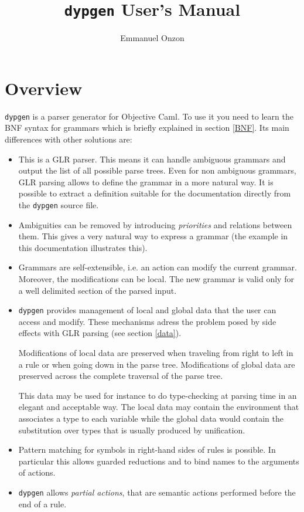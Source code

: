 \documentclass[12pt]{article}
\title{\texttt{dypgen} User's Manual}
\author{Emmanuel Onzon}
\begin{document}
\maketitle

\section*{Overview}

\texttt{dypgen} is a parser generator for Objective Caml. 
  To use it you need to learn the BNF syntax for grammars
  which is briefly explained in section \ref{BNF}.
 Its main differences with other solutions are:
\begin{itemize}
\item This is a GLR parser. This means it can handle ambiguous
  grammars and output the list of all possible parse trees. Even for
  non ambiguous grammars, GLR parsing allows to define the grammar in
  a more natural way. It is possible to extract a definition suitable
  for the documentation directly from the \texttt{dypgen} source file.
  
\item Ambiguities can be removed by introducing {\em priorities} and
  relations between them. This gives a very natural way to express a
  grammar (the example in this documentation illustrates this).

\item Grammars are self-extensible, i.e. an action can modify the
  current grammar. Moreover, the modifications can be local. The new
  grammar is valid only for a well delimited section of the parsed input.
 
\item \verb#dypgen# provides management of local and global data that
  the user can access and modify. These mechanisms adress the problem
  posed by side effects with GLR parsing (see section \ref{data}).
  
  Modifications of local data are preserved when traveling from right to
  left in a rule or when going down in the parse tree. Modifications of
  global data are preserved across the complete traversal of the parse
  tree.

  This data may be used for instance to do type-checking at parsing
  time in an elegant and acceptable way. The local data may
  contain the environment that associates a type to each variable while the
  global data would contain the substitution over types that is
  usually produced by unification.
  
\item Pattern matching for symbols in right-hand sides of rules is possible.
  In particular this allows guarded reductions and to bind names
  to the arguments of actions.

\item \verb#dypgen# allows {\em partial actions}, that are semantic actions
  performed before the end of a rule.
\end{itemize} 
\newpage
\end{document}
